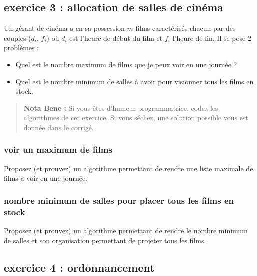 \documentclass[
]{article}
\providecommand{\tightlist}{%
  \setlength{\itemsep}{0pt}\setlength{\parskip}{0pt}}
\begin{document}
\hypertarget{exercice-3-allocation-de-salles-de-cinuxe9ma}{%
\subsection{exercice 3 : allocation de salles de
cinéma}\label{exercice-3-allocation-de-salles-de-cinuxe9ma}}

Un gérant de cinéma a en sa possession \(m\) films caractérisés chacun
par des couples (\(d_i\), \(f_i\)) où \(d_i\) est l'heure de début du
film et \(f_i\) l'heure de fin. Il se pose 2 problèmes :

\begin{itemize}
\tightlist
\item
  Quel est le nombre maximum de films que je peux voir en une journée ?
\item
  Quel est le nombre minimum de salles à avoir pour visionner tous les
  films en stock.
\end{itemize}

\begin{quote}
\textbf{Nota Bene :} Si vous êtes d'humeur programmatrice, codez les
algorithmes de cet exercice. Si vous séchez, une solution possible vous
est donnée dans le corrigé.
\end{quote}

\hypertarget{voir-un-maximum-de-films}{%
\subsubsection{voir un maximum de
films}\label{voir-un-maximum-de-films}}

Proposez (et prouvez) un algorithme permettant de rendre une liste
maximale de films à voir en une journée.

\hypertarget{nombre-minimum-de-salles-pour-placer-tous-les-films-en-stock}{%
\subsubsection{nombre minimum de salles pour placer tous les films en
stock}\label{nombre-minimum-de-salles-pour-placer-tous-les-films-en-stock}}

Proposez (et prouvez) un algorithme permettant de rendre le nombre
minimum de salles et son organisation permettant de projeter tous les
films.

\hypertarget{exercice-4-ordonnancement}{%
\subsection{exercice 4 :
ordonnancement}\label{exercice-4-ordonnancement}}
\end{document}
